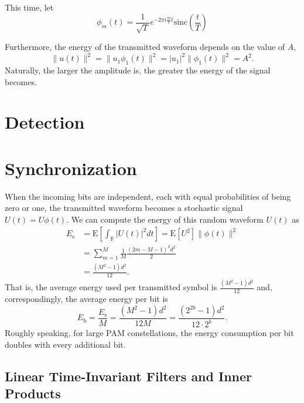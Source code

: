 \begin{example}
This time, let
\begin{equation*}
\phi_m(t) = \frac{1}{\sqrt{T}} e^{-2 \pi i \frac{m}{T} t} \mathrm{sinc} \left( \frac{t}{T} \right)
\end{equation*}
\end{example}



Furthermore, the energy of the transmitted waveform depends on the value of $A$,
\begin{equation*}
\| u(t) \|^2 = \| u_1 \phi_1 (t) \|^2 = |u_1|^2 \| \phi_1(t) \|^2 = A^2 .
\end{equation*}
Naturally, the larger the amplitude is, the greater the energy of the signal becomes.
\section{Detection}

\section{Synchronization}

When the incoming bits are independent, each with equal probabilities of being zero or one, the transmitted waveform becomes a stochastic signal $U(t) = U \phi(t)$.
We can compute the energy of this random waveform $U(t)$ as
\begin{equation*}
\begin{split}
E_{\mathrm{s}} &= \mathrm{E} \left[ \int_{\mathbb{R}} |U(t)|^2 dt \right]
= \mathrm{E} \left[ U^2 \right] \| \phi (t) \|^2 \\
&= \sum_{m=1}^M \frac{1}{M} \frac{(2m - M - 1)^2 d^2}{2} \\
&= \frac{\left( M^2 - 1 \right) d^2}{12} .
\end{split}
\end{equation*}
That is, the average energy used per transmitted symbol is $\frac{(M^2 - 1) d^2}{12}$ and, correspondingly, the average energy per bit is
\begin{equation*}
E_{\mathrm{b}} = \frac{ E_{\mathrm{s}} }{M}
= \frac{\left( M^2 - 1 \right) d^2}{12M}
= \frac{\left( 2^{2b} - 1 \right) d^2}{12 \cdot 2^b} .
\end{equation*}
Roughly speaking, for large PAM constellations, the energy consumption per bit doubles with every additional bit.


\subsection{Linear Time-Invariant Filters and Inner Products}



